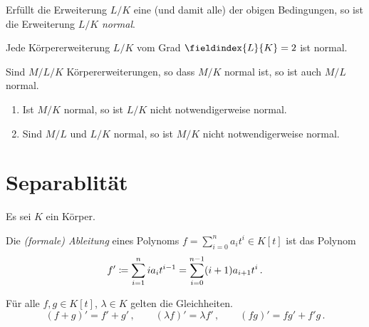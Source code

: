 \begin{definition}
  Erfüllt die Erweiterung $L/K$ eine \textup(und damit alle\textup) der obigen Bedingungen, so ist die Erweiterung $L/K$ \emph{normal}.
\end{definition}

\begin{example}
  Jede Körpererweiterung $L/K$ vom Grad $\fieldindex{L}{K} = 2$ ist normal.
\end{example}

\begin{lemma}
  Sind $M/L/K$ Körpererweiterungen, so dass $M/K$ normal ist, so ist auch $M/L$ normal.
\end{lemma}

\begin{warning}
  \begin{enumerate}
    \item
      Ist $M/K$ normal, so ist $L/K$ nicht notwendigerweise normal.
    \item
      Sind $M/L$ und $L/K$ normal, so ist $M/K$ nicht notwendigerweise normal.
  \end{enumerate}
\end{warning}










\pagebreak










\section{Separablität}

Es sei $K$ ein Körper.

\begin{definition}
  Die \emph{\textup(formale\textup) Ableitung} eines Polynoms $f = \sum_{i=0}^n a_i t^i \in K[t]$ ist das Polynom
  \[
              f'
    \coloneqq  \sum_{i=1}^n i a_i t^{i-1}
    =         \sum_{i=0}^{n-1} (i+1) a_{i+1} t^i \,.
  \]
\end{definition}

\begin{lemma}
  Für alle $f, g \in K[t]$, $\lambda \in K$ gelten die Gleichheiten.
  \[
    (f + g)' = f' + g' \,,
    \qquad
    (\lambda f)' = \lambda f' \,,
    \qquad
    (fg)' = fg' + f'g \,.
  \]

\end{lemma}



